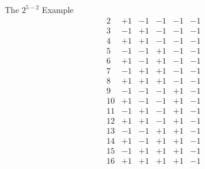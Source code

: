 \begin{itemize}
\begin{Example}{The $ 2^{5-2} $ Example}{}
\[\begin{array}{cccccc}
                              2                & +1              & -1              & -1              & -1              & -1              \\
                              3                & -1              & +1              & -1              & -1              & -1              \\
                              4                & +1              & +1              & -1              & -1              & -1              \\
                              5                & -1              & -1              & +1              & -1              & -1              \\
                              6                & +1              & -1              & +1              & -1              & -1              \\
                              7                & -1              & +1              & +1              & -1              & -1              \\
                              8                & +1              & +1              & +1              & -1              & -1              \\
                              9                & -1              & -1              & -1              & +1              & -1              \\
                              10               & +1              & -1              & -1              & +1              & -1              \\
                              11               & -1              & +1              & -1              & +1              & -1              \\
                              12               & +1              & +1              & -1              & +1              & -1              \\
                              13               & -1              & -1              & +1              & +1              & -1              \\
                              14               & +1              & -1              & +1              & +1              & -1              \\
                              15               & -1              & +1              & +1              & +1              & -1              \\
                              16               & +1              & +1              & +1              & +1              & -1              \\

\end{array}\]
\end{Example}
\end{itemize}
